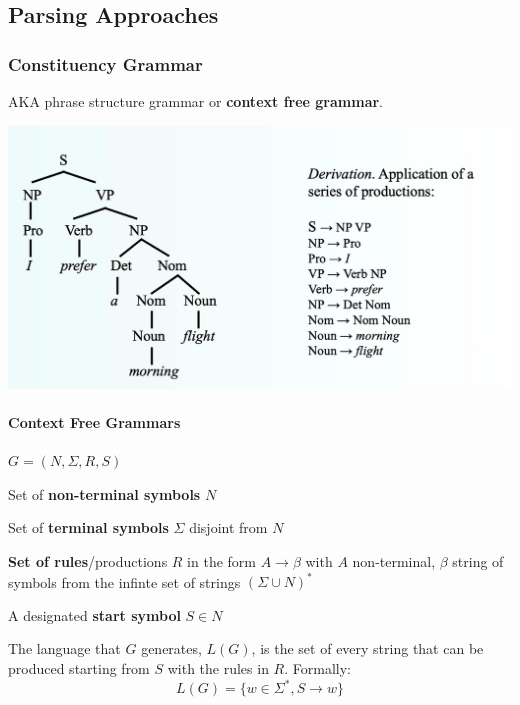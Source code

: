 \documentclass[10pt]{report}
\begin{document}
\subsection{Parsing Approaches}
\subsubsection{Constituency Grammar}
AKA phrase structure grammar or \textbf{context free grammar}.
\begin{center}
	\includegraphics[scale=0.5]{36.png}
\end{center}
\paragraph{Context Free Grammars} $G = (N,\Sigma, R, S)$
\begin{list}{}{}
	\item Set of \textbf{non-terminal symbols} $N$
	\item Set of \textbf{terminal symbols} $\Sigma$ disjoint from $N$
	\item \textbf{Set of rules}/productions $R$ in the form $A\rightarrow\beta$ with $A$ non-terminal, $\beta$ string of symbols from the infinte set of strings $(\Sigma\cup N)^*$
	\item A designated \textbf{start symbol} $S \in N$
\end{list}
The language that $G$ generates, $L(G)$, is the set of every string that can be produced starting from $S$ with the rules in $R$. Formally:
$$L(G) = \{w\in \Sigma^*, S\rightarrow w\}$$
\end{document}
